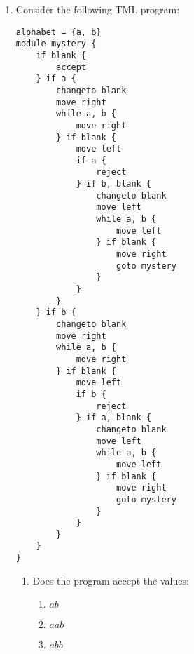 \documentclass[answers]{exam}
\begin{document}
\begin{enumerate}
\begin{enumerate}
\begin{solution}
            \end{solution}
        \end{enumerate}
        \newpage

        \item Consider the following TML program:
\begin{lstlisting}[language=TML]
alphabet = {a, b}
module mystery {
    if blank {
        accept
    } if a {
        changeto blank
        move right
        while a, b {
            move right
        } if blank {
            move left
            if a {
                reject
            } if b, blank {
                changeto blank
                move left
                while a, b {
                    move left
                } if blank {
                    move right
                    goto mystery
                }
            }
        }
    } if b {
        changeto blank
        move right
        while a, b {
            move right
        } if blank {
            move left
            if b {
                reject
            } if a, blank {
                changeto blank
                move left
                while a, b {
                    move left
                } if blank {
                    move right
                    goto mystery
                }
            }
        }
    }
}
\end{lstlisting}
        \begin{enumerate}
            \item Does the program accept the values:
            \begin{enumerate}
                \item $ab$
                \begin{solution}
                    
                \end{solution}
                \newpage
                
                \item $aab$
                \begin{solution}
                    
                \end{solution}
                
                \item $abb$
                \begin{solution}
                    
                \end{solution}
                

\end{enumerate}
\end{enumerate}
\end{enumerate}
\end{document}
